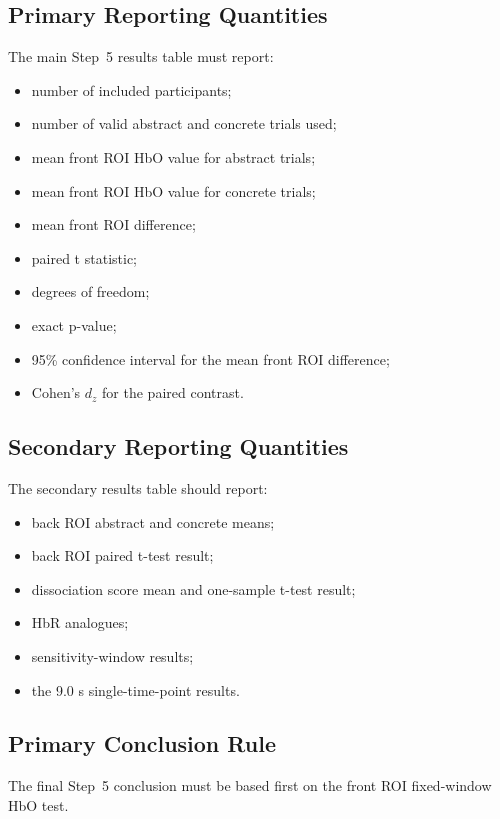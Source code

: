 \documentclass[11pt]{article}
\begin{document}
\subsection{Primary Reporting Quantities}
The main Step~5 results table must report:
\begin{itemize}
    \item number of included participants;
    \item number of valid abstract and concrete trials used;
    \item mean front ROI HbO value for abstract trials;
    \item mean front ROI HbO value for concrete trials;
    \item mean front ROI difference;
    \item paired t statistic;
    \item degrees of freedom;
    \item exact p-value;
    \item 95\% confidence interval for the mean front ROI difference;
    \item Cohen's \(d_z\) for the paired contrast.
\end{itemize}

\subsection{Secondary Reporting Quantities}
The secondary results table should report:
\begin{itemize}
    \item back ROI abstract and concrete means;
    \item back ROI paired t-test result;
    \item dissociation score mean and one-sample t-test result;
    \item HbR analogues;
    \item sensitivity-window results;
    \item the 9.0 s single-time-point results.
\end{itemize}

\subsection{Primary Conclusion Rule}
The final Step~5 conclusion must be based first on the front ROI fixed-window HbO test.
\end{document}
